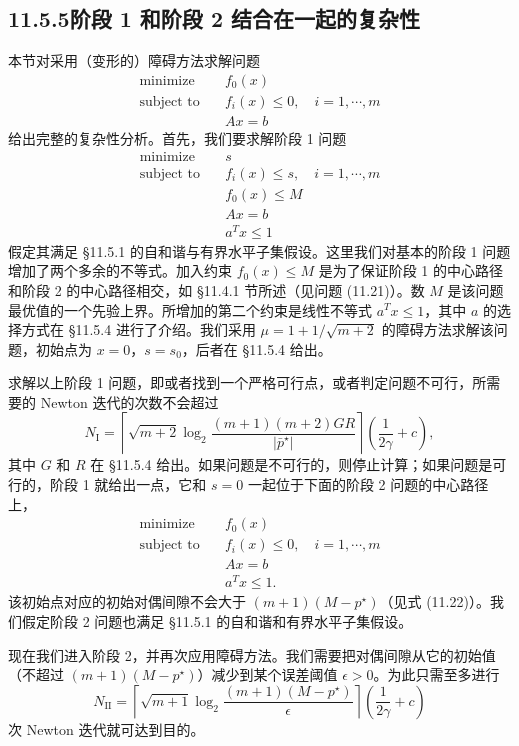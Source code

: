\documentclass[UTF8, 12pt, fontset=fandol, oneside]{ctexart}
\begin{document}
\subsection*{11.5.5\quad 阶段 1 和阶段 2 结合在一起的复杂性}

本节对采用（变形的）障碍方法求解问题
\[
\begin{aligned}
\text{minimize}\quad & f_0(x)\\
\text{subject to}\quad & f_i(x)\leq 0,\quad i=1,\cdots,m\\
& Ax=b
\end{aligned}
\]
给出完整的复杂性分析。首先，我们要求解阶段 1 问题
\[
\begin{aligned}
\text{minimize}\quad & s\\
\text{subject to}\quad & f_i(x)\leq s,\quad i=1,\cdots,m\\
& f_0(x)\leq M\\
& Ax=b\\
& a^Tx\leq 1
\end{aligned}
\]
假定其满足 \S11.5.1 的自和谐与有界水平子集假设。这里我们对基本的阶段 1 问题增加了两个多余的不等式。加入约束 $f_0(x)\leq M$ 是为了保证阶段 1 的中心路径和阶段 2 的中心路径相交，如 \S11.4.1 节所述（见问题 (11.21)）。数 $M$ 是该问题最优值的一个先验上界。所增加的第二个约束是线性不等式 $a^Tx\leq 1$，其中 $a$ 的选择方式在 \S11.5.4 进行了介绍。我们采用 $\mu=1+1/\sqrt{m+2}$ 的障碍方法求解该问题，初始点为 $x=0$，$s=s_0$，后者在 \S11.5.4 给出。

求解以上阶段 1 问题，即或者找到一个严格可行点，或者判定问题不可行，所需要的 Newton 迭代的次数不会超过
\begin{equation}
N_{\mathrm{I}}=\left\lceil\sqrt{m+2}\log_2\frac{(m+1)(m+2)GR}{|\bar{p}^\star|}\right\rceil
\left(\frac{1}{2\gamma}+c\right),
\tag{11.36}
\end{equation}
其中 $G$ 和 $R$ 在 \S11.5.4 给出。如果问题是不可行的，则停止计算；如果问题是可行的，阶段 1 就给出一点，它和 $s=0$ 一起位于下面的阶段 2 问题的中心路径上，
\[
\begin{aligned}
\text{minimize}\quad & f_0(x)\\
\text{subject to}\quad & f_i(x)\leq 0,\quad i=1,\cdots,m\\
& Ax=b\\
& a^Tx\leq 1.
\end{aligned}
\]
该初始点对应的初始对偶间隙不会大于 $(m+1)(M-p^\star)$（见式 (11.22)）。我们假定阶段 2 问题也满足 \S11.5.1 的自和谐和有界水平子集假设。

现在我们进入阶段 2，并再次应用障碍方法。我们需要把对偶间隙从它的初始值（不超过 $(m+1)(M-p^\star)$）减少到某个误差阈值 $\epsilon>0$。为此只需至多进行
\begin{equation}
N_{\mathrm{II}}=\left\lceil\sqrt{m+1}\log_2\frac{(m+1)(M-p^\star)}{\epsilon}\right\rceil
\left(\frac{1}{2\gamma}+c\right)
\tag{11.37}
\end{equation}
次 Newton 迭代就可达到目的。
\end{document}
